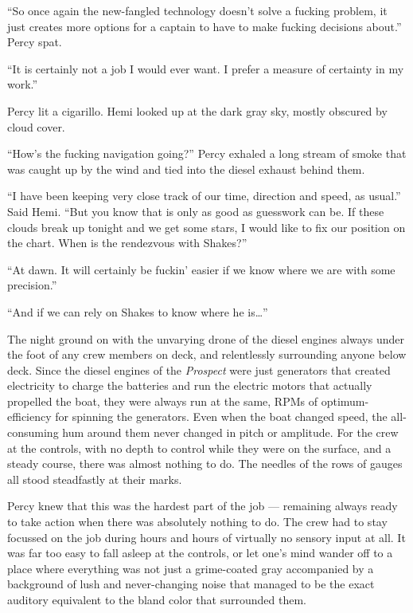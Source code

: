 \documentclass[]{scrbook}
\begin{document}
``So once again the new-fangled technology doesn't solve a fucking
problem, it just creates more options for a captain to have to make
fucking decisions about.'' Percy spat.

``It is certainly not a job I would ever want. I prefer a measure of
certainty in my work.''

Percy lit a cigarillo. Hemi looked up at the dark gray sky, mostly
obscured by cloud cover.

``How's the fucking navigation going?'' Percy exhaled a long stream of
smoke that was caught up by the wind and tied into the diesel exhaust
behind them.

``I have been keeping very close track of our time, direction and speed,
as usual.'' Said Hemi. ``But you know that is only as good as guesswork
can be. If these clouds break up tonight and we get some stars, I would
like to fix our position on the chart. When is the rendezvous with
Shakes?''

``At dawn. It will certainly be fuckin' easier if we know where we are
with some precision.''

``And if we can rely on Shakes to know where he is\ldots{}''

The night ground on with the unvarying drone of the diesel engines
always under the foot of any crew members on deck, and relentlessly
surrounding anyone below deck. Since the diesel engines of the
\emph{Prospect} were just generators that created electricity to charge
the batteries and run the electric motors that actually propelled the
boat, they were always run at the same, RPMs of optimum-efficiency for
spinning the generators. Even when the boat changed speed, the
all-consuming hum around them never changed in pitch or amplitude. For
the crew at the controls, with no depth to control while they were on
the surface, and a steady course, there was almost nothing to do. The
needles of the rows of gauges all stood steadfastly at their marks.

Percy knew that this was the hardest part of the job --- remaining
always ready to take action when there was absolutely nothing to do. The
crew had to stay focussed on the job during hours and hours of virtually
no sensory input at all. It was far too easy to fall asleep at the
controls, or let one's mind wander off to a place where everything was
not just a grime-coated gray accompanied by a background of lush and
never-changing noise that managed to be the exact auditory equivalent to
the bland color that surrounded them.
\end{document}
